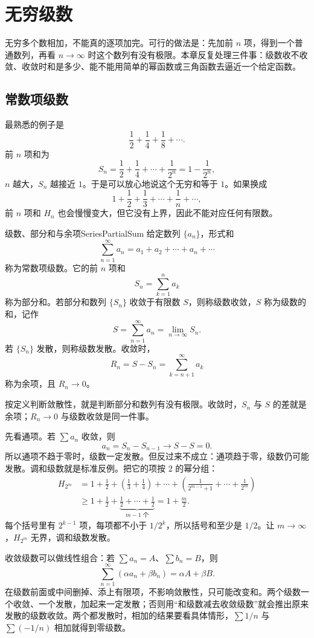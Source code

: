\section{无穷级数}

无穷多个数相加，不能真的逐项加完。可行的做法是：先加前 $n$ 项，得到一个普通数列，再看 $n\to\infty$ 时这个数列有没有极限。本章反复处理三件事：级数收不收敛、收敛时和是多少、能不能用简单的幂函数或三角函数去逼近一个给定函数。

\subsection{常数项级数}

最熟悉的例子是
\[
\frac12+\frac14+\frac18+\cdots .
\]
前 $n$ 项和为
\[
S_n=\frac12+\frac14+\cdots+\frac1{2^n}=1-\frac1{2^n},
\]
$n$ 越大，$S_n$ 越接近 $1$。于是可以放心地说这个无穷和等于 $1$。如果换成
\[
1+\frac12+\frac13+\cdots+\frac1n+\cdots,
\]
前 $n$ 项和 $H_n$ 也会慢慢变大，但它没有上界，因此不能对应任何有限数。

\begin{mydef}{级数、部分和与余项}{SeriesPartialSum}
    给定数列 $\{a_n\}$，形式和
    \[
        \sum_{n=1}^{\infty}a_n=a_1+a_2+\cdots+a_n+\cdots
    \]
    称为常数项级数。它的前 $n$ 项和
    \[
        S_n=\sum_{k=1}^{n}a_k
    \]
    称为部分和。若部分和数列 $\{S_n\}$ 收敛于有限数 $S$，则称级数收敛，$S$ 称为级数的和，记作
    \[
        S=\sum_{n=1}^{\infty}a_n=\lim_{n\to\infty}S_n.
    \]
    若 $\{S_n\}$ 发散，则称级数发散。收敛时，
    \[
        R_n=S-S_n=\sum_{k=n+1}^{\infty}a_k
    \]
    称为余项，且 $R_n\to0$。
\end{mydef}

按定义判断敛散性，就是判断部分和数列有没有极限。收敛时，$S_n$ 与 $S$ 的差就是余项；$R_n\to0$ 与级数收敛是同一件事。

先看通项。若 $\sum a_n$ 收敛，则
\[
a_n=S_n-S_{n-1}\longrightarrow S-S=0.
\]
所以通项不趋于零时，级数一定发散。但反过来不成立：通项趋于零，级数仍可能发散。调和级数就是标准反例。把它的项按 $2$ 的幂分组：
\[
\begin{aligned}
H_{2^m}
&=1+\frac12+\left(\frac13+\frac14\right)+\cdots+
\left(\frac1{2^{m-1}+1}+\cdots+\frac1{2^m}\right)\\
&\ge 1+\frac12+\underbrace{\frac12+\cdots+\frac12}_{m-1\text{ 个}}
=1+\frac m2.
\end{aligned}
\]
每个括号里有 $2^{k-1}$ 项，每项都不小于 $1/2^k$，所以括号和至少是 $1/2$。让 $m\to\infty$，$H_{2^m}$ 无界，调和级数发散。

收敛级数可以做线性组合：若 $\sum a_n=A$、$\sum b_n=B$，则
\[
\sum_{n=1}^{\infty}(\alpha a_n+\beta b_n)=\alpha A+\beta B.
\]
在级数前面或中间删掉、添上有限项，不影响敛散性，只可能改变和。两个级数一个收敛、一个发散，加起来一定发散；否则用“和级数减去收敛级数”就会推出原来发散的级数收敛。两个都发散时，相加的结果要看具体情形，$\sum 1/n$ 与 $\sum(-1/n)$ 相加就得到零级数。

